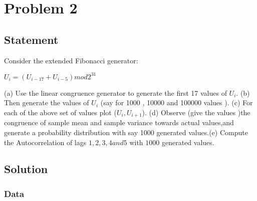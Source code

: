 \documentclass[10pt]{article}
\begin{document}
\section{Problem 2}
\subsection{Statement}
Consider the extended Fibonacci generator:\\
\begin{center}
	$U_i=(U_{i-17}+U_{i-5}) mod 2^{31}$
\end{center}

(a) Use the linear congruence generator to generate the first 17 values of $U_i$. (b) Then generate the values of $U_i$ (say for 1000 , 10000 and 100000 values ). (c) For each of the above set of values plot ($U_i,U_{i+1}$). (d) Observe (give the values )the congruence of sample mean and sample variance towards actual values,and generate a  probability distribution with say 1000 generated values.(e) Compute the Autocorrelation of lags $1,2,3,4 and 5 $ with $1000$ generated values. 
\subsection{Solution}
\subsubsection{Data}
\end{document}
